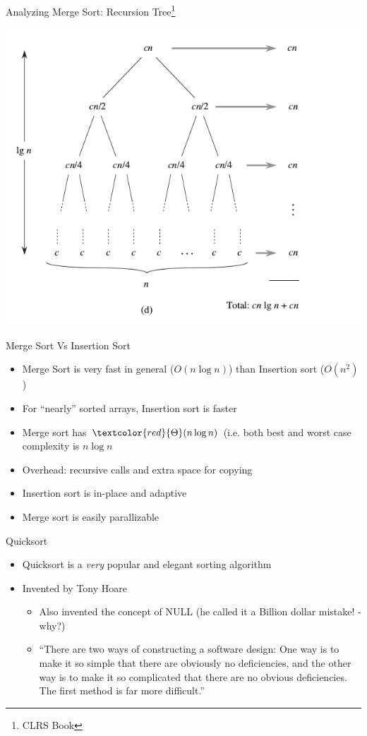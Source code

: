 \documentclass{beamer}
\newcommand{\hred}[1]{{\textcolor{red}{#1}}}
\begin{document}
\begin{frame}{Analyzing Merge Sort: Recursion Tree\footnote{CLRS Book}}
\begin{center}
    \includegraphics[scale=0.4]{mergeSortRecursionTree2.png}
\end{center}
\end{frame}


\begin{frame}{Merge Sort Vs Insertion Sort}
\begin{itemize}
\item Merge Sort is very fast in general ($O(n \log n)$) than Insertion sort ($O(n^2)$)
\item For ``nearly'' sorted arrays, Insertion sort is faster
\item Merge sort has $\hred{\Theta}(n \log n)$ (i.e. both best and worst case complexity is $n \log n$
\item Overhead: recursive calls and extra space for copying
\item Insertion sort is in-place and adaptive
\item Merge sort is easily parallizable 
\end{itemize}
\end{frame}

\begin{frame}{Quicksort}
\begin{itemize}
\item Quicksort is a {\em very} popular and elegant sorting algorithm
\item Invented by Tony Hoare
\begin{itemize}
    \item Also invented the concept of NULL (he called it a Billion dollar mistake! - why?)
    \item ``There are two ways of constructing a software design: One way is to make it so simple that there are obviously no deficiencies, and the other way is to make it so complicated that there are no obvious deficiencies. The first method is far more difficult.''
\end{itemize}
\end{itemize}
\end{frame}
\end{document}
